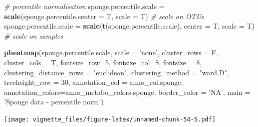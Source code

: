 \documentclass[]{book}
\newenvironment{Shaded}{\begin{snugshade}}{\end{snugshade}}
\newcommand{\KeywordTok}[1]{\textcolor[rgb]{0.13,0.29,0.53}{\textbf{#1}}}
\newcommand{\DataTypeTok}[1]{\textcolor[rgb]{0.13,0.29,0.53}{#1}}
\newcommand{\DecValTok}[1]{\textcolor[rgb]{0.00,0.00,0.81}{#1}}
\newcommand{\StringTok}[1]{\textcolor[rgb]{0.31,0.60,0.02}{#1}}
\newcommand{\CommentTok}[1]{\textcolor[rgb]{0.56,0.35,0.01}{\textit{#1}}}
\newcommand{\NormalTok}[1]{#1}
\begin{document}
\begin{Shaded}
\begin{Highlighting}[]
\CommentTok{# percentile normalisation}
\NormalTok{sponge.percentile.scale =}\StringTok{ }\KeywordTok{scale}\NormalTok{(sponge.percentile,}\DataTypeTok{center =}\NormalTok{ T, }\DataTypeTok{scale =}\NormalTok{ T) }\CommentTok{# scale on OTUs}
\NormalTok{sponge.percentile.scale =}\StringTok{ }\KeywordTok{scale}\NormalTok{(}\KeywordTok{t}\NormalTok{(sponge.percentile.scale), }\DataTypeTok{center =}\NormalTok{ T, }\DataTypeTok{scale =}\NormalTok{ T) }\CommentTok{# scale on samples}

\KeywordTok{pheatmap}\NormalTok{(sponge.percentile.scale, }
         \DataTypeTok{scale =} \StringTok{'none'}\NormalTok{, }
         \DataTypeTok{cluster_rows =}\NormalTok{ F, }
         \DataTypeTok{cluster_cols =}\NormalTok{ T, }
         \DataTypeTok{fontsize_row=}\DecValTok{5}\NormalTok{, }\DataTypeTok{fontsize_col=}\DecValTok{8}\NormalTok{,}
         \DataTypeTok{fontsize =} \DecValTok{8}\NormalTok{,}
         \DataTypeTok{clustering_distance_rows =} \StringTok{"euclidean"}\NormalTok{,}
         \DataTypeTok{clustering_method =} \StringTok{"ward.D"}\NormalTok{,}
         \DataTypeTok{treeheight_row =} \DecValTok{30}\NormalTok{,}
         \DataTypeTok{annotation_col =}\NormalTok{ anno_col.sponge,}
         \DataTypeTok{annotation_colors=}\NormalTok{anno_metabo_colors.sponge,}
         \DataTypeTok{border_color =} \StringTok{'NA'}\NormalTok{,}
         \DataTypeTok{main =} \StringTok{'Sponge data - percentile norm'}\NormalTok{)}
\end{Highlighting}
\end{Shaded}

\texttt{[image: vignette\_files/figure-latex/unnamed-chunk-54-5.pdf]}
\end{document}
